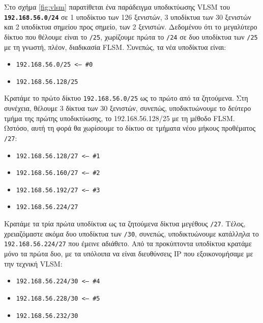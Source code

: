 \documentclass{EdipyLabs} %
\begin{document}
Στο σχήμα \ref{fig:vlsm} παρατίθεται ένα παράδειγμα υποδικτύωσης VLSM του \textbf{\texttt{192.168.56.0/24}} σε 1 υποδίκτυο των 126 ξενιστών, 3 υποδίκτυα των 30 ξενιστών και 2 υποδίκτυα σημείου προς σημείο, των 2 ξενιστών. Δεδομένου ότι το μεγαλύτερο δίκτυο που θέλουμε είναι το \texttt{/25}, χωρίζουμε πρώτα το \texttt{/24} σε δυο υποδίκτυα των \texttt{/25} με τη γνωστή, πλέον, διαδικασία FLSM. Συνεπώς, τα νέα υποδίκτυα είναι:
\begin{itemize}
	\item \texttt{192.168.56.0/25 <-- \#0}
	\item \texttt{192.168.56.128/25}
\end{itemize}
Κρατάμε το πρώτο δίκτυο \texttt{192.168.56.0/25} ως το πρώτο από τα ζητούμενα. Στη συνέχεια, θέλουμε 3 δίκτυα των 30 ξενιστών, συνεπώς, υποδικτυώνουμε το δεύτερο τμήμα της πρώτης υποδικτύωσης, το 192.168.56.128/25 με τη μέθοδο FLSM. Ωστόσο, αυτή τη φορά θα χωρίσουμε το δίκτυο σε τμήματα νέου μήκους προθέματος \texttt{/27}:
\begin{itemize}
	\item \texttt{192.168.56.128/27 <-- \#1}
	\item \texttt{192.168.56.160/27 <-- \#2}
	\item \texttt{192.168.56.192/27 <-- \#3}
	\item \texttt{192.168.56.224/27}
\end{itemize}

Κρατάμε τα τρία πρώτα υποδίκτυα ως τα ζητούμενα δίκτυα μεγέθους \texttt{/27}. Τέλος, χρειαζόμαστε ακόμα δυο υποδίκτυα των \texttt{/30}, συνεπώς, υποδικτυώνουμε κατάλληλα το \texttt{192.168.56.224/27} που έμεινε αδιάθετο. Από τα προκύπτοντα υποδίκτυα κρατάμε μόνο τα πρώτα δυο, με τα υπόλοιπα να είναι διευθύνσεις IP που εξοικονομήσαμε με την τεχνική VLSM:
\begin{itemize}
	\item \texttt{192.168.56.224/30 <-- \#4}
	\item \texttt{192.168.56.228/30 <-- \#5}
	\item \texttt{192.168.56.232/30}
\end{itemize}

\newpage
\restoregeometry
\end{document}
